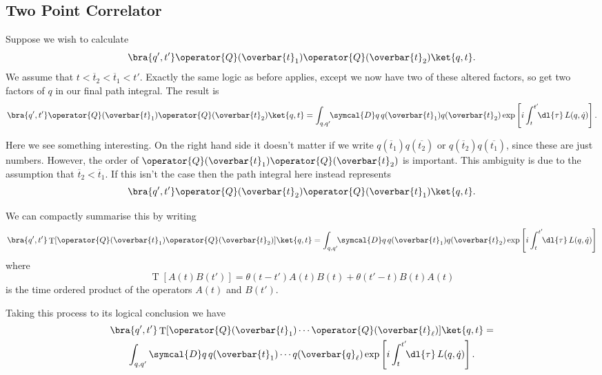 \documentclass[fleqn]{NotesClass}
\newcommand{\lagrangian}{L}
\newcommand{\heaviside}{\theta}
\DeclareMathOperator{\timeOrdering}{T}
\newcommand{\DL}[1]{\symcal{D}#1}
\begin{document}
    \subsection{Two Point Correlator}
    Suppose we wish to calculate
    \begin{equation}
        \bra{q',t'} \operator{Q}(\overbar{t}_1)\operator{Q}(\overbar{t}_2)\ket{q,t}.
    \end{equation}
    We assume that \(t < \overbar{t}_2 < \overbar{t}_1 < t'\).
    Exactly the same logic as before applies, except we now have two of these altered factors, so get two factors of \(q\) in our final path integral.
    The result is
    \begin{equation}
        \bra{q',t'} \operator{Q}(\overbar{t}_1)\operator{Q}(\overbar{t}_2)\ket{q,t} = \int_{q,q'} \!\! \DL{q} \, q(\overbar{t}_1)q(\overbar{t}_2) \exp\left[ i\int_t^{t'} \!\! \dl{\tau} \, \lagrangian(q, \dot{q}) \right].
    \end{equation}

    Here we see something interesting.
    On the right hand side it doesn't matter if we write \(q(\overbar{t}_1)q(\overbar{t_2})\) or \(q(\overbar{t}_2)q(\overbar{t_1})\), since these are just numbers.
    However, the order of \(\operator{Q}(\overbar{t}_1)\operator{Q}(\overbar{t}_2)\) is important.
    This ambiguity is due to the assumption that \(\overbar{t}_2 < \overbar{t}_1\).
    If this isn't the case then the path integral here instead represents
    \begin{equation}
        \bra{q',t'} \operator{Q}(\overbar{t}_2)\operator{Q}(\overbar{t}_1)\ket{q,t}.
    \end{equation}
    
    We can compactly summarise this by writing
    \begin{equation}
        \bra{q',t'} \timeOrdering[\operator{Q}(\overbar{t}_1)\operator{Q}(\overbar{t}_2)]\ket{q,t} = \int_{q,q'} \!\! \DL{q} \, q(\overbar{t}_1)q(\overbar{t}_2) \exp\left[ i\int_t^{t'} \!\! \dl{\tau} \, \lagrangian(q, \dot{q}) \right]
    \end{equation}
    where
    \begin{equation}
        \timeOrdering[A(t)B(t')] = \heaviside(t - t')A(t)B(t) + \heaviside(t' - t)B(t)A(t)
    \end{equation}
    is the time ordered product of the operators \(A(t)\) and \(B(t')\).
    
    Taking this process to its logical conclusion we have
    \begin{multline}\label{eqn:time ordered positions}
        \bra{q',t'} \timeOrdering[\operator{Q}(\overbar{t}_1) \dotsm \operator{Q}(\overbar{t}_\ell)]\ket{q,t} =\\
        \int_{q,q'} \!\!\ \DL{q} \, q(\overbar{t}_1) \dotsm q(\overbar{q}_\ell) \exp\left[ i \int_t^{t'} \!\! \dl{\tau} \, \lagrangian(q, \dot{q}) \right].
    \end{multline}
    
\end{document}
